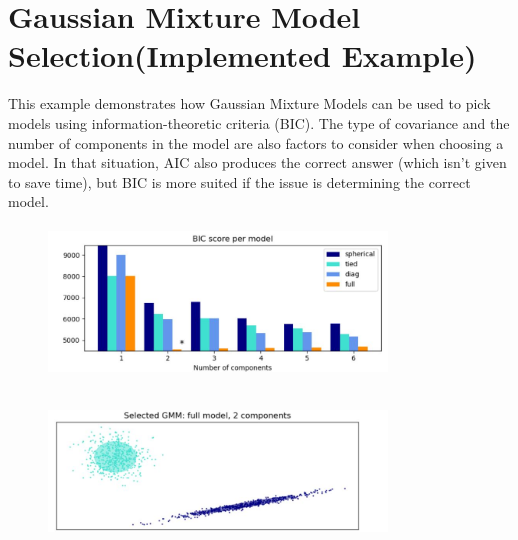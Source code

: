 \documentclass[conference]{IEEEtran}
\begin{document}
\section{Gaussian Mixture Model Selection(Implemented Example)}

This example demonstrates how Gaussian Mixture Models can be used to pick models using information-theoretic criteria (BIC). The type of covariance and the number of components in the model are also factors to consider when choosing a model. In that situation, AIC also produces the correct answer (which isn't given to save time), but BIC is more suited if the issue is determining the correct model.


\begin{figure}[h]
    \centering
    \includegraphics[width=9cm,height=4cm]{exampleone.JPG}
    \end{figure}

\begin{figure}[h]
    \centering
    \includegraphics[width=9cm,height=4cm]{exampletwo.JPG}
    \end{figure}
    
\end{document}
